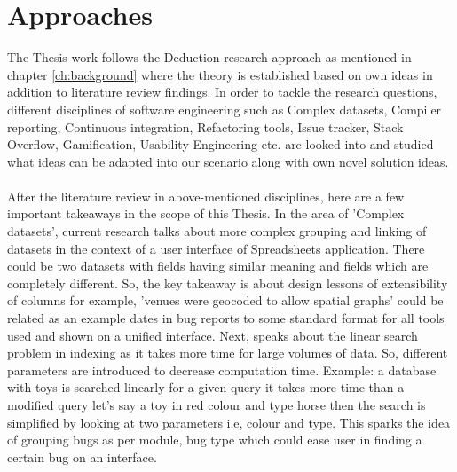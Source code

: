 \chapter{Approaches}
\label{ch:approaches}

The Thesis work follows the Deduction research approach as mentioned in chapter \ref{ch:background} where the theory is established based on own ideas in addition to literature review findings. In order to tackle the research questions, different disciplines of software engineering such as Complex datasets, Compiler reporting, Continuous integration, Refactoring tools, Issue tracker, Stack Overflow, Gamification, Usability Engineering etc. are looked into and studied what ideas can be adapted into our scenario along with own novel solution ideas.\\ \\

After the literature review in above-mentioned disciplines, here are a few important takeaways in the scope of this Thesis. In the area of 'Complex datasets', current research \cite{Dix} talks about more complex grouping and linking of datasets in the context of a user interface of Spreadsheets application. There could be two datasets with fields having similar meaning and fields which are completely different. So, the key takeaway is about design lessons of extensibility of columns for example, 'venues were geocoded to allow spatial graphs' could be related as an example dates in bug reports to some standard format for all tools used and shown on a unified interface. Next, \cite{Gaur} speaks about the linear search problem in indexing as it takes more time for large volumes of data. So, different parameters are introduced to decrease computation time. Example: a database with toys is searched linearly for a given query it takes more time than a modified query let's say a toy in red colour and type horse then the search is simplified by looking at two parameters i.e, colour and type. This sparks the idea of grouping bugs as per module, bug type which could ease user in finding a certain bug on an interface.  \\ \\

